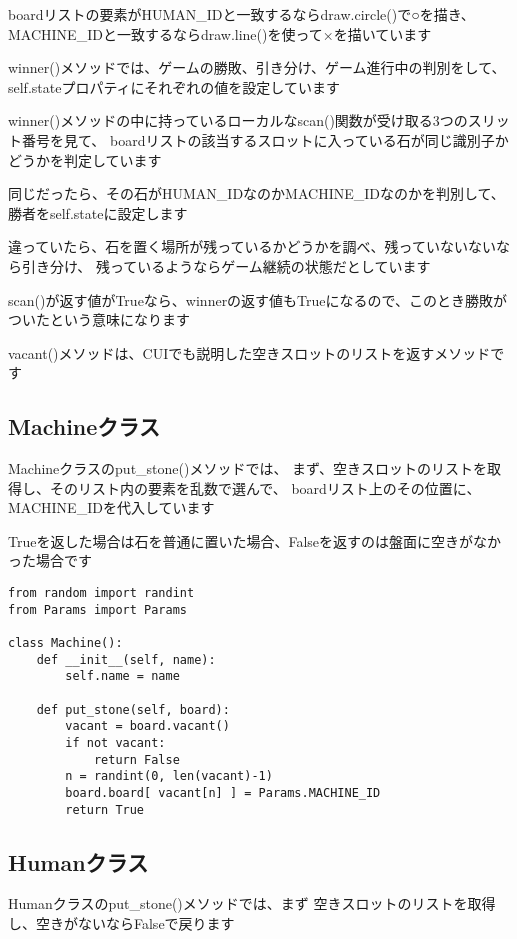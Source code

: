 \documentclass[uplatex,a4paper,11pt,oneside,openany]{jsbook}
\begin{document}
boardリストの要素がHUMAN\_IDと一致するならdraw.circle()で○を描き、
MACHINE\_IDと一致するならdraw.line()を使って×を描いています

winner()メソッドでは、ゲームの勝敗、引き分け、ゲーム進行中の判別をして、
self.stateプロパティにそれぞれの値を設定しています

winner()メソッドの中に持っているローカルなscan()関数が受け取る3つのスリット番号を見て、
boardリストの該当するスロットに入っている石が同じ識別子かどうかを判定しています

同じだったら、その石がHUMAN\_IDなのかMACHINE\_IDなのかを判別して、勝者をself.stateに設定します

違っていたら、石を置く場所が残っているかどうかを調べ、残っていないないなら引き分け、
残っているようならゲーム継続の状態だとしています

scan()が返す値がTrueなら、winnerの返す値もTrueになるので、このとき勝敗がついたという意味になります

vacant()メソッドは、CUIでも説明した空きスロットのリストを返すメソッドです

\subsection{Machineクラス}

Machineクラスのput\_stone()メソッドでは、
まず、空きスロットのリストを取得し、そのリスト内の要素を乱数で選んで、
boardリスト上のその位置に、MACHINE\_IDを代入しています

Trueを返した場合は石を普通に置いた場合、Falseを返すのは盤面に空きがなかった場合です

\begin{lstlisting}[caption=class Machine,label=prog05-1]
from random import randint
from Params import Params

class Machine():
    def __init__(self, name):
        self.name = name

    def put_stone(self, board):
        vacant = board.vacant()
        if not vacant:
            return False
        n = randint(0, len(vacant)-1)
        board.board[ vacant[n] ] = Params.MACHINE_ID
        return True
\end{lstlisting}%

\subsection{Humanクラス}

Humanクラスのput\_stone()メソッドでは、まず
空きスロットのリストを取得し、空きがないならFalseで戻ります
\end{document}

